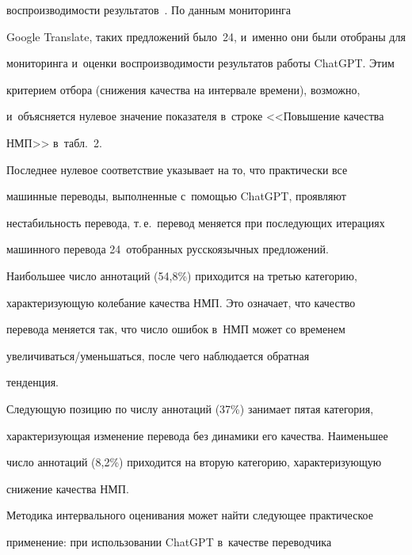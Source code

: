 воспроизводимости результатов~\cite{21-eg, 22-eg}. По данным мониторинга 


\mbox{Google} Translate, таких предложений было~24, и~именно они были отоб\-ра\-ны для 


мониторинга и~оцен\-ки вос\-про\-из\-во\-ди\-мости результатов работы \mbox{ChatGPT}. Этим 


критерием отбора (снижения качества на интервале времени), воз\-мож\-но, 


и~объясняется нулевое значение показателя в~строке <<Повышение качества 


НМП>> в~табл.~2.


   


   Последнее нулевое соответствие указывает на то, что практически все 


машинные переводы, выполненные с~по\-мощью \mbox{ChatGPT}, проявляют 


не\-ста\-биль\-ность перевода, т.\,е.\ перевод меняется при по\-сле\-ду\-ющих итерациях 


машинного перевода 24~отоб\-ран\-ных русскоязычных предложений. 


   


   Наибольшее число аннотаций (54,8\%) приходится на тре\-тью категорию, 


ха\-рак\-те\-ри\-зу\-ющую колебание качества НМП. Это означает, что качество 


перевода меняется так, что чис\-ло ошибок в~НМП может со временем  


уве\-ли\-чи\-вать\-ся\!/\!умень\-шать\-ся, после чего наблюдается обратная 


тенденция. 


   


   Следующую позицию по числу аннотаций (37\%) занимает пятая категория, 


ха\-рак\-те\-ри\-зу\-ющая изменение перевода без динамики его качества. Наименьшее 


чис\-ло аннотаций (8,2\%) приходится на вторую категорию, ха\-рак\-те\-ри\-зу\-ющую 


снижение качества НМП. 


   


   Методика интервального оценивания может найти сле\-ду\-ющее практическое 


применение: при использовании \mbox{ChatGPT} в~качестве переводчика 


